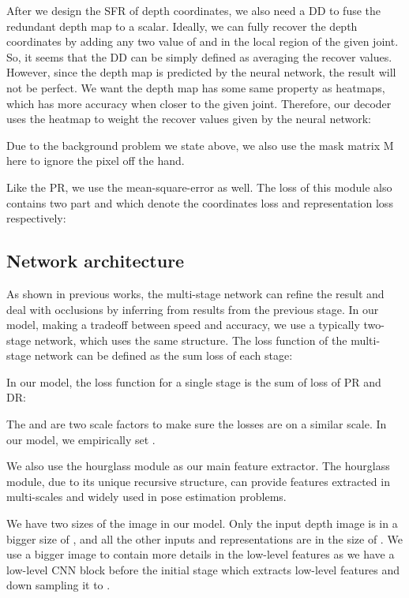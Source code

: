 \documentclass[journal]{IEEEtran}
\begin{document}
After we design the SFR of depth coordinates, we also need a DD to fuse the redundant depth map to a scalar. 
Ideally, we can fully recover the depth coordinates by adding any two value of  and  in the local region of the given joint. 
So, it seems that the DD can be simply defined as averaging the recover values. 
However, since the depth map  is predicted by the neural network, the result will not be perfect. 
We want the depth map has some same property as heatmaps, which has more accuracy when closer to the given joint. 
Therefore, our decoder uses the heatmap to weight the recover values given by the neural network:



Due to the background problem we state above, we also use the mask matrix M here to ignore the pixel off the hand.
 
Like the PR, we use the mean-square-error as well. 
The loss of this module also contains two part  and  which denote the coordinates loss and representation loss respectively:





\subsection{Network architecture}

As shown in previous works\cite{wei2016convolutional, chen2017pose, wan2018dense, bulat2016human}, 
the multi-stage network can refine the result and 
deal with occlusions by inferring from results from the previous stage. 
In our model, making a tradeoff between speed and accuracy, we use a typically two-stage network, which uses the same structure. 
The loss function of the multi-stage network can be defined as the sum loss of each stage:



In our model, the loss function for a single stage is the sum of loss of PR and DR:



The  and  are two scale factors to make sure the losses are on a similar scale. 
In our model, we empirically set .

We also use the hourglass module\cite{newell2016stacked} as our main feature extractor. 
The hourglass module, due to its unique recursive structure, can provide features extracted in multi-scales and 
widely used in pose estimation problems. 

We have two sizes of the image in our model. 
Only the input depth image is in a bigger size of , 
and all the other inputs and representations are in the size of . 
We use a bigger image to contain more details in the low-level features as we have a low-level CNN block before the initial stage 
which extracts low-level features and down sampling it to .
\end{document}
